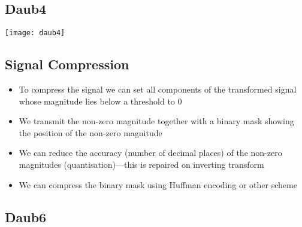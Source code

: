 
\begin{slide}
\section{Daub4}

\begin{center}
\texttt{[image: daub4]}  
\end{center}

\end{slide}


\begin{slide}
\section{Signal Compression}

\begin{PauseHighLight}
  \begin{itemize}
  \item To compress the signal we can set all components of the
    transformed signal whose magnitude lies below a threshold to 0\pause
  \item We transmit the non-zero magnitude together with a binary mask
    showing the position of the non-zero magnitude\pause
  \item We can reduce the accuracy (number of decimal places) of the
    non-zero magnitudes (quantisation)---this is repaired on inverting
    transform\pause
  \item We can compress the binary mask using Huffman encoding or other
    scheme\pause
  \end{itemize}
\end{PauseHighLight}

\end{slide}


\begin{slide}
\section{Daub6}
\pb\pause{}
\begin{center}
  \pause
\end{center}
\end{slide}


